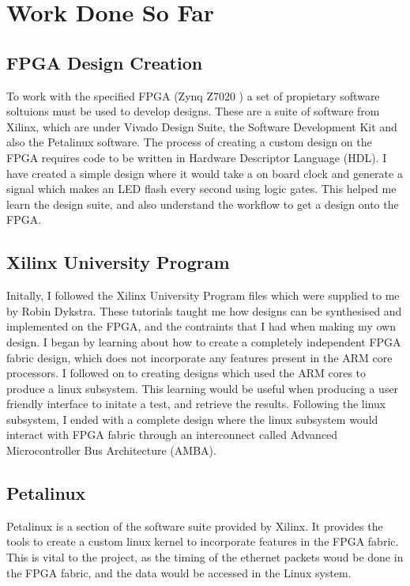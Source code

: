 \chapter{Work Done So Far}\label{C:workDoneSoFar}

\section{FPGA Design Creation}

\par To work with the specified FPGA (Zynq Z7020 \cite{fpga}) a set of propietary software soltuions must be used to develop designs.
These are a suite of software from Xilinx, which are under Vivado Design Suite, the Software Development Kit and also the Petalinux software.
The process of creating a custom design on the FPGA requires code to be written in Hardware Descriptor Language (HDL).
I have created a simple design where it would take a on board clock and generate a signal which makes an LED flash every second using logic gates.
This helped me learn the design suite, and also understand the workflow to get a design onto the FPGA.

\section{Xilinx University Program}

\par Initally, I followed the Xilinx University Program files which were supplied to me by Robin Dykstra. 
These tutorials taught me how designs can be synthesised and implemented on the FPGA, and the contraints that I had when making my own design.
I began by learning about how to create a completely independent FPGA fabric design, which does not incorporate any features present in the ARM core processors.
I followed on to creating designs which used the ARM cores to produce a linux subsystem. 
This learning would be useful when producing a user friendly interface to initate a test, and retrieve the results.
Following the linux subsystem, I ended with a complete design where the linux subsystem would interact with FPGA fabric through an interconnect called Advanced Microcontroller Bus Architecture (AMBA).

\section{Petalinux}

\par Petalinux is a section of the software suite provided by Xilinx. 
It provides the tools to create a custom linux kernel to incorporate features in the FPGA fabric.
This is vital to the project, as the timing of the ethernet packets woud be done in the FPGA fabric, and the data would be accessed in the Linux system.

